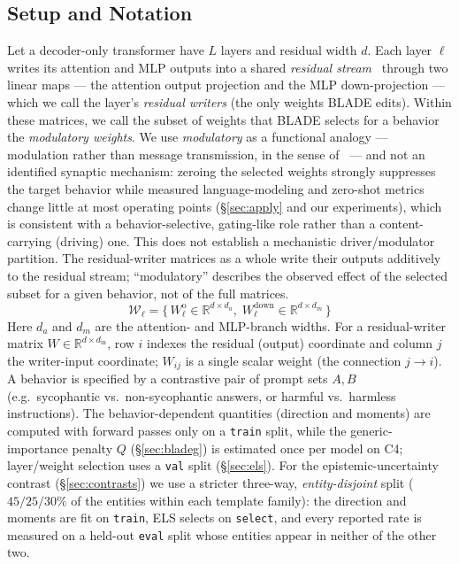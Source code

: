 \subsection{Setup and Notation} Let a decoder-only transformer have $L$ layers and residual width $d$. Each layer $\ell$ writes its attention and MLP outputs into a shared \emph{residual stream}~\cite{elhage2021framework} through two linear maps --- the attention output projection and the MLP down-projection --- which we call the layer's \emph{residual writers} (the only weights BLADE edits). Within these matrices, we call the subset of weights that BLADE selects for a behavior the \emph{modulatory weights}. We use \emph{modulatory} as a functional analogy --- modulation rather than message transmission, in the sense of~\cite{sherman1998thalamus} --- and not an identified synaptic mechanism: zeroing the selected weights strongly suppresses the target behavior while measured language-modeling and zero-shot metrics change little at most operating points (\S\ref{sec:apply} and our experiments), which is consistent with a behavior-selective, gating-like role rather than a content-carrying (driving) one. This does not establish a mechanistic driver/modulator partition. The residual-writer matrices as a whole write their outputs additively to the residual stream; ``modulatory'' describes the observed effect of the selected subset for a given behavior, not of the full matrices.
\begin{equation}
  \mathcal{W}_\ell=\{\,W^{\mathrm{o}}_\ell\in\mathbb{R}^{d\times d_a},\;
                      W^{\mathrm{down}}_\ell\in\mathbb{R}^{d\times d_m}\,\}
\end{equation}
Here $d_a$ and $d_m$ are the attention- and MLP-branch widths. For a residual-writer matrix $W\in\mathbb{R}^{d\times d_{\text{in}}}$, row $i$ indexes the residual (output) coordinate and column $j$ the writer-input coordinate; $W_{ij}$ is a single scalar weight (the connection $j\to i$). A behavior is specified by a contrastive pair of prompt sets $A,B$ (e.g.\ sycophantic vs.\ non-sycophantic answers, or harmful vs.\ harmless instructions). The behavior-dependent quantities (direction and moments) are computed with forward passes only on a \texttt{train} split, while the generic-importance penalty $Q$ (\S\ref{sec:bladeg}) is estimated once per model on C4; layer/weight selection uses a \texttt{val} split (\S\ref{sec:els}). For the epistemic-uncertainty contrast (\S\ref{sec:contrasts}) we use a stricter three-way, \emph{entity-disjoint} split ($45/25/30\%$ of the entities within each template family): the direction and moments are fit on \texttt{train}, ELS selects on \texttt{select}, and every reported rate is measured on a held-out \texttt{eval} split whose entities appear in neither of the other two.


